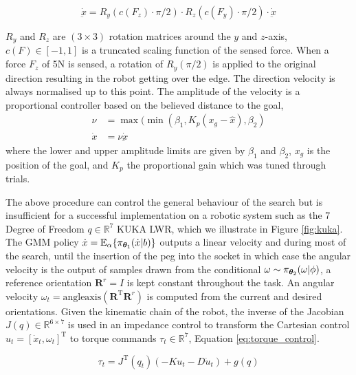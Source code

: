 \begin{equation}
  \dot{\underbar{x}} = R_y(c(F_z) \cdot \pi/2) \cdot R_z(c(F_y) \cdot \pi/2) \cdot \dot{\underbar{x}} \label{eq:modulation}
\end{equation}

$R_y$ and $R_z$ are $(3 \times 3)$ rotation matrices around the $y$ and $z$-axis, $c(F) \in [-1,1]$ is a truncated scaling function of the sensed 
force.  When a force $F_z$ of 5N is sensed, a rotation of $R_y(\pi/2)$ is applied to the original direction resulting in the robot
getting over the edge. The direction velocity is always normalised up to this point. The amplitude of the velocity is a proportional
controller based on the believed distance to the goal,
\begin{align}
  \nu     &= \max(\min(\beta_1,K_p (x_g - \hat{x}),\beta_2)\label{eq:prop_speed}\\ \nonumber
  \dot{x} &= \nu \dot{\underbar{x}}
\end{align}
where the lower and upper amplitude limits are given by $\beta_1$ and $\beta_2$, $x_g$ is the position of the
goal, and $K_p$ the proportional gain which was tuned through trials. 

The above procedure can control the general behaviour of the search but is insufficient for a successful implementation on a robotic system 
such as the 7 Degree of Freedom $q\in\mathbb{R}^7$ KUKA LWR, which we illustrate in Figure \ref{fig:kuka}. 
The GMM policy $\dot{x} = \mathbb{E}_{\alpha}\{\pi_{\boldsymbol{\theta}_1}(\dot{x}|b)\}$ outputs a linear velocity and during most 
of the search, until the insertion of the peg into the socket in which case the angular velocity is the output of samples drawn from 
the conditional $\omega \sim \pi_{\boldsymbol{\theta}_2}(\omega|\phi)$, a reference orientation $\mathbf{R}^r = I$ 
is kept constant throughout the task. An angular velocity $\omega_t = \mathrm{angleaxis}(\mathbf{R}^{\mathrm{T}} \mathbf{R}^r)$ 
is computed from the current and desired orientations. Given the kinematic chain of the robot, the inverse of 
the Jacobian $J(q) \in \mathbb{R}^{6\times 7}$ is used in an impedance control to transform the 
Cartesian control $u_t = [\dot{x}_t,\omega_t]^{\mathrm{T}}$ to torque commands $\tau_t \in \mathbb{R}^7$, Equation \ref{eq:torque_control}.

\begin{equation}\label{eq:torque_control}
 \tau_t = J^{\mathrm{T}}(q_t)\left(-K u_t - D \dot{u}_t \right) + g(q)
\end{equation}

